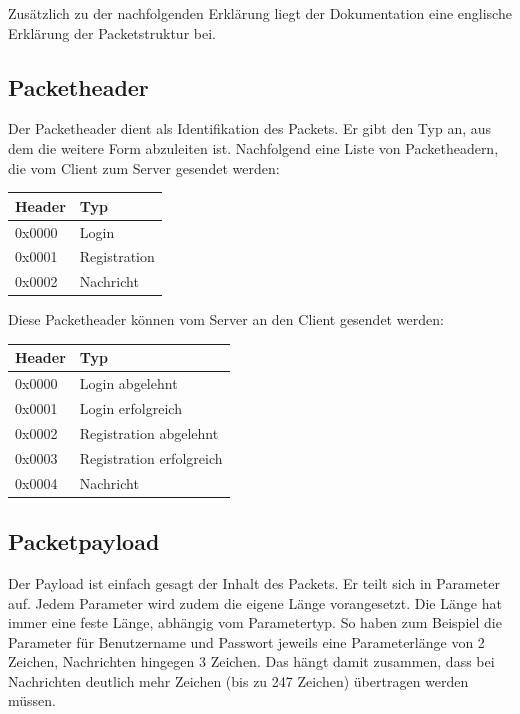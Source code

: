 \documentclass[a4paper,12pt]{scrartcl}
\begin{document}
Zusätzlich zu der nachfolgenden Erklärung liegt der Dokumentation eine englische Erklärung der Packetstruktur bei.

\subsection{Packetheader}
Der Packetheader dient als Identifikation des Packets. Er gibt den Typ an, aus dem die weitere Form abzuleiten ist. Nachfolgend eine Liste von Packetheadern, die vom Client zum Server gesendet werden:
\begin{table}[h]
    \centering
    \begin{tabular}{|l|l|}
    \hline
    \textbf{Header} & \textbf{Typ}          \\ \hline
    0x0000 & Login        \\ \hline
    0x0001 & Registration \\ \hline
    0x0002 & Nachricht    \\ \hline
    \end{tabular}
\end{table}

Diese Packetheader können vom Server an den Client gesendet werden:
\begin{table}[h]
    \centering
    \begin{tabular}{|l|l|}
    \hline
    \textbf{Header} & \textbf{Typ}          \\ \hline
    0x0000 & Login abgelehnt          \\ \hline
    0x0001 & Login erfolgreich        \\ \hline
    0x0002 & Registration abgelehnt   \\ \hline
    0x0003 & Registration erfolgreich \\ \hline
    0x0004 & Nachricht                \\ \hline
    \end{tabular}
\end{table}

\subsection{Packetpayload}
Der Payload ist einfach gesagt der Inhalt des Packets. Er teilt sich in Parameter auf. Jedem Parameter wird zudem die eigene Länge vorangesetzt. Die Länge hat immer eine feste Länge, abhängig vom Parametertyp. So haben zum Beispiel die Parameter für Benutzername und Passwort jeweils eine Parameterlänge von 2 Zeichen, Nachrichten hingegen 3 Zeichen. Das hängt damit zusammen, dass bei Nachrichten deutlich mehr Zeichen (bis zu 247 Zeichen) übertragen werden müssen.
\end{document}
